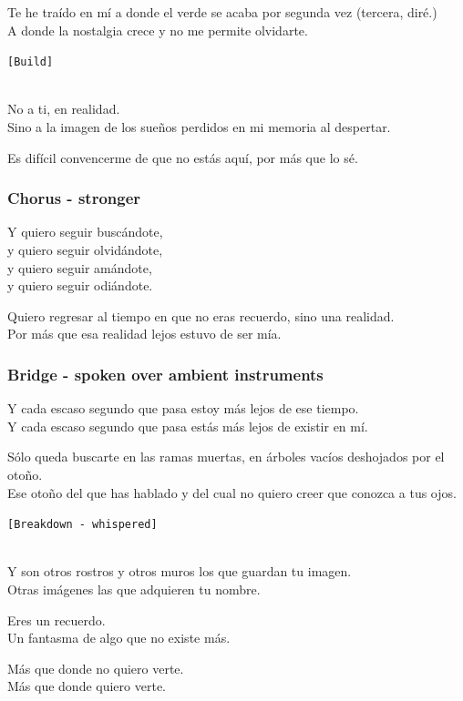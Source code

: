 Te he traído en mí a donde el verde se acaba por segunda vez (tercera,
diré.)\\
A donde la nostalgia crece y no me permite olvidarte.

\texttt{{[}Build{]}}\strut \\
No a ti, en realidad.\\
Sino a la imagen de los sueños perdidos en mi memoria al despertar.

Es difícil convencerme de que no estás aquí, por más que lo sé.

\subsubsection{Chorus - stronger}\label{chorus---stronger}

Y quiero seguir buscándote,\\
y quiero seguir olvidándote,\\
y quiero seguir amándote,\\
y quiero seguir odiándote.

Quiero regresar al tiempo en que no eras recuerdo, sino una realidad.\\
Por más que esa realidad lejos estuvo de ser mía.

\subsubsection{Bridge - spoken over ambient
instruments}\label{bridge---spoken-over-ambient-instruments}

Y cada escaso segundo que pasa estoy más lejos de ese tiempo.\\
Y cada escaso segundo que pasa estás más lejos de existir en mí.

Sólo queda buscarte en las ramas muertas, en árboles vacíos deshojados
por el otoño.\\
Ese otoño del que has hablado y del cual no quiero creer que conozca a
tus ojos.

\texttt{{[}Breakdown\ -\ whispered{]}}\strut \\
Y son otros rostros y otros muros los que guardan tu imagen.\\
Otras imágenes las que adquieren tu nombre.

Eres un recuerdo.\\
Un fantasma de algo que no existe más.

Más que donde no quiero verte.\\
Más que donde quiero verte.


